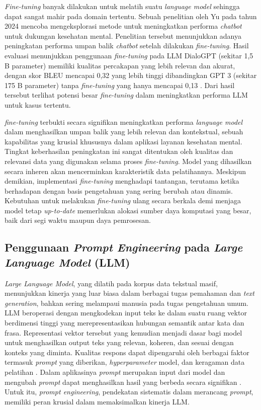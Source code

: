 \textit{Fine-tuning} banyak dilakukan untuk melatih suatu \textit{language model} sehingga dapat sangat mahir pada domain tertentu.
Sebuah penelitian oleh Yu pada tahun 2024 mencoba mengeksplorasi metode untuk meningkatkan performa \textit{chatbot} untuk dukungan kesehatan mental.
Penelitian tersebut menunjukkan adanya peningkatan performa umpan balik \textit{chatbot} setelah dilakukan \textit{fine-tuning}.
Hasil evaluasi menunjukkan penggunaan \textit{fine-tuning} pada LLM DialoGPT (sekitar 1,5 B parameter) memiliki kualitas percakapan yang lebih relevan dan akurat, dengan skor BLEU mencapai 0,32 yang lebih tinggi dibandingkan GPT 3 (sekitar 175 B parameter) tanpa \textit{fine-tuning} yang hanya mencapai 0,13 \cite{yu2024FineTuneOnMentalHealthChatbotExperimental}.
Dari hasil tersebut terlihat potensi besar \textit{fine-tuning} dalam meningkatkan performa LLM untuk kasus tertentu.

\textit{fine-tuning} terbukti secara signifikan meningkatkan performa \textit{language model} dalam menghasilkan umpan balik yang lebih relevan dan kontekstual, sebuah kapabilitas yang krusial khususnya dalam aplikasi layanan kesehatan mental.
Tingkat keberhasilan peningkatan ini sangat ditentukan oleh kualitas dan relevansi data yang digunakan selama proses \textit{fine-tuning}.
Model yang dihasilkan secara inheren akan mencerminkan karakteristik data pelatihannya.
Meskipun demikian, implementasi \textit{fine-tuning} menghadapi tantangan, terutama ketika berhadapan dengan basis pengetahuan yang sering berubah atau dinamis.
Kebutuhan untuk melakukan \textit{fine-tuning} ulang secara berkala demi menjaga model tetap \textit{up-to-date} memerlukan alokasi sumber daya komputasi yang besar, baik dari segi waktu maupun daya pemrosesan.


\subsection{Penggunaan \textit{Prompt Engineering} pada \textit{Large Language Model} (LLM)}
\textit{Large Language Model}, yang dilatih pada korpus data tekstual masif, menunjukkan kinerja yang luar biasa dalam berbagai tugas pemahaman dan \textit{text generation}, bahkan sering melampaui manusia pada tugas pengetahuan umum.
LLM beroperasi dengan mengkodekan input teks ke dalam suatu ruang vektor berdimensi tinggi yang merepresentasikan hubungan semantik antar kata dan frasa.
Representasi vektor tersebut yang kemudian menjadi dasar bagi model untuk menghasilkan output teks yang relevan, koheren, dan sesuai dengan konteks yang diminta.
Kualitas respons dapat dipengaruhi oleh berbagai faktor termasuk \textit{prompt} yang diberikan, \textit{hyperparameter} model, dan keragaman data pelatihan \cite{Chen2025UnleashingPotentialPromptEngineering}.
Dalam aplikasinya \textit{prompt} merupakan input dari model dan mengubah \textit{prompt} dapat menghasilkan hasil yang berbeda secara signifikan \cite{Kaddour2023ChallengesApplicationsLLM}.
Untuk itu, \textit{prompt engineering}, pendekatan sistematis dalam merancang \textit{prompt}, memiliki peran krusial dalam memaksimalkan kinerja LLM.


